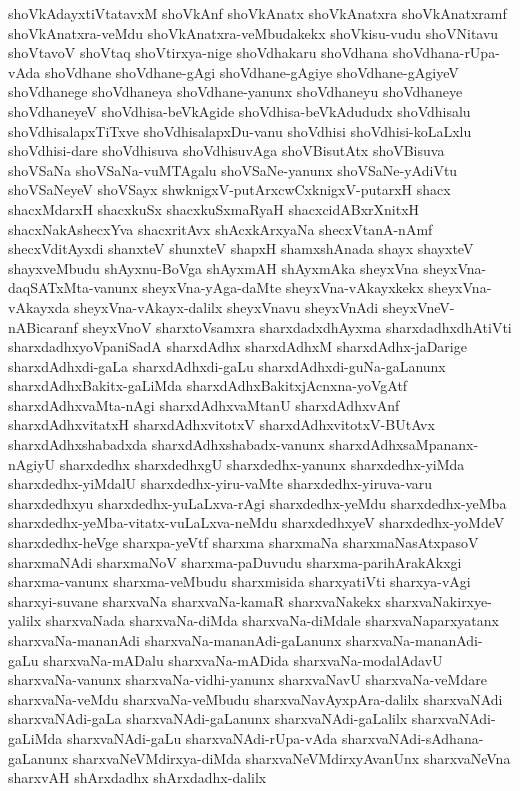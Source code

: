 {shoVkAdayxtiVtatavxM
shoVkAnf
shoVkAnatx
shoVkAnatxra
shoVkAnatxramf
shoVkAnatxra-veMdu
shoVkAnatxra-veMbudakekx
shoVkisu-vudu
shoVNitavu
shoVtavoV
shoVtaq
shoVtirxya-nige
shoVdhakaru
shoVdhana
shoVdhana-rUpa-vAda
shoVdhane
shoVdhane-gAgi
shoVdhane-gAgiye
shoVdhane-gAgiyeV
shoVdhanege
shoVdhaneya
shoVdhane-yanunx
shoVdhaneyu
shoVdhaneye
shoVdhaneyeV
shoVdhisa-beVkAgide
shoVdhisa-beVkAdududx
shoVdhisalu
shoVdhisalapxTiTxve
shoVdhisalapxDu-vanu
shoVdhisi
shoVdhisi-koLaLxlu
shoVdhisi-dare
shoVdhisuva
shoVdhisuvAga
shoVBisutAtx
shoVBisuva
shoVSaNa
shoVSaNa-vuMTAgalu
shoVSaNe-yanunx
shoVSaNe-yAdiVtu
shoVSaNeyeV
shoVSayx
shwknigxV-putArxcwCxknigxV-putarxH
shacx
shacxMdarxH
shacxkuSx
shacxkuSxmaRyaH
shacxcidABxrXnitxH
shacxNakAshecxYva
shacxritAvx
shAcxkArxyaNa
shecxVtanA-nAmf
shecxVditAyxdi
shanxteV
shunxteV
shapxH
shamxshAnada
shayx
shayxteV
shayxveMbudu
shAyxnu-BoVga
shAyxmAH
shAyxmAka
sheyxVna
sheyxVna-daqSATxMta-vanunx
sheyxVna-yAga-daMte
sheyxVna-vAkayxkekx
sheyxVna-vAkayxda
sheyxVna-vAkayx-dalilx
sheyxVnavu
sheyxVnAdi
sheyxVneV-nABicaranf
sheyxVnoV
sharxtoVsamxra
sharxdadxdhAyxma
sharxdadhxdhAtiVti
sharxdadhxyoVpaniSadA
sharxdAdhx
sharxdAdhxM
sharxdAdhx-jaDarige
sharxdAdhxdi-gaLa
sharxdAdhxdi-gaLu
sharxdAdhxdi-guNa-gaLanunx
sharxdAdhxBakitx-gaLiMda
sharxdAdhxBakitxjAcnxna-yoVgAtf
sharxdAdhxvaMta-nAgi
sharxdAdhxvaMtanU
sharxdAdhxvAnf
sharxdAdhxvitatxH
sharxdAdhxvitotxV
sharxdAdhxvitotxV-BUtAvx
sharxdAdhxshabadxda
sharxdAdhxshabadx-vanunx
sharxdAdhxsaMpananx-nAgiyU
sharxdedhx
sharxdedhxgU
sharxdedhx-yanunx
sharxdedhx-yiMda
sharxdedhx-yiMdalU
sharxdedhx-yiru-vaMte
sharxdedhx-yiruva-varu
sharxdedhxyu
sharxdedhx-yuLaLxva-rAgi
sharxdedhx-yeMdu
sharxdedhx-yeMba
sharxdedhx-yeMba-vitatx-vuLaLxva-neMdu
sharxdedhxyeV
sharxdedhx-yoMdeV
sharxdedhx-heVge
sharxpa-yeVtf
sharxma
sharxmaNa
sharxmaNasAtxpasoV
sharxmaNAdi
sharxmaNoV
sharxma-paDuvudu
sharxma-parihArakAkxgi
sharxma-vanunx
sharxma-veMbudu
sharxmisida
sharxyatiVti
sharxya-vAgi
sharxyi-suvane
sharxvaNa
sharxvaNa-kamaR
sharxvaNakekx
sharxvaNakirxye-yalilx
sharxvaNada
sharxvaNa-diMda
sharxvaNa-diMdale
sharxvaNaparxyatanx
sharxvaNa-mananAdi
sharxvaNa-mananAdi-gaLanunx
sharxvaNa-mananAdi-gaLu
sharxvaNa-mADalu
sharxvaNa-mADida
sharxvaNa-modalAdavU
sharxvaNa-vanunx
sharxvaNa-vidhi-yanunx
sharxvaNavU
sharxvaNa-veMdare
sharxvaNa-veMdu
sharxvaNa-veMbudu
sharxvaNavAyxpAra-dalilx
sharxvaNAdi
sharxvaNAdi-gaLa
sharxvaNAdi-gaLanunx
sharxvaNAdi-gaLalilx
sharxvaNAdi-gaLiMda
sharxvaNAdi-gaLu
sharxvaNAdi-rUpa-vAda
sharxvaNAdi-sAdhana-gaLanunx
sharxvaNeVMdirxya-diMda
sharxvaNeVMdirxyAvanUnx
sharxvaNeVna
sharxvAH
shArxdadhx
shArxdadhx-dalilx
}
